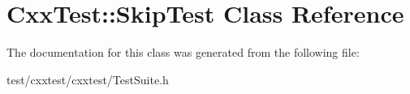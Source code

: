 \hypertarget{classCxxTest_1_1SkipTest}{\section{Cxx\-Test\-:\-:Skip\-Test Class Reference}
\label{classCxxTest_1_1SkipTest}
}


The documentation for this class was generated from the following file\-:\begin{DoxyCompactItemize}
\item 
test/cxxtest/cxxtest/Test\-Suite.\-h\end{DoxyCompactItemize}
